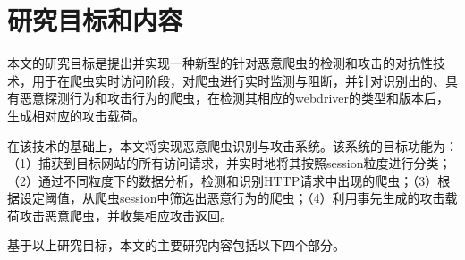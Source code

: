 \documentclass[doctor,privacy,twoside]{buaa_mac}
\begin{document}
\section{研究目标和内容}
本文的研究目标是提出并实现一种新型的针对恶意爬虫的检测和攻击的对抗性技术，用于在爬虫实时访问阶段，对爬虫进行实时监测与阻断，并针对识别出的、具有恶意探测行为和攻击行为的爬虫，在检测其相应的webdriver的类型和版本后，生成相对应的攻击载荷。

在该技术的基础上，本文将实现恶意爬虫识别与攻击系统。该系统的目标功能为：（1）捕获到目标网站的所有访问请求，并实时地将其按照session粒度进行分类；（2）通过不同粒度下的数据分析，检测和识别HTTP请求中出现的爬虫；（3）根据设定阈值，从爬虫session中筛选出恶意行为的爬虫；（4）利用事先生成的攻击载荷攻击恶意爬虫，并收集相应攻击返回。

基于以上研究目标，本文的主要研究内容包括以下四个部分。
\end{document}

